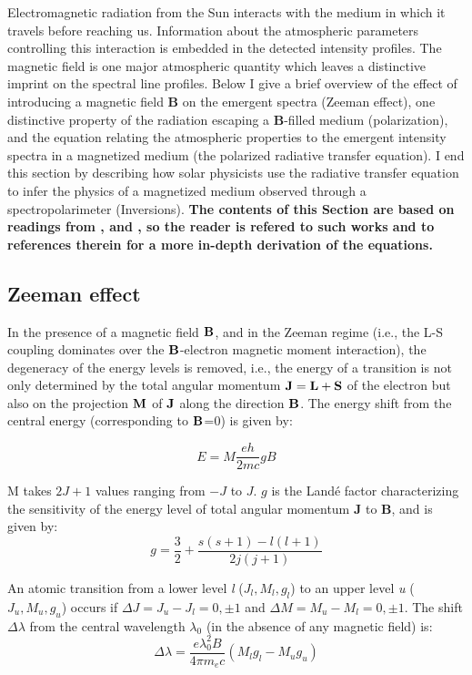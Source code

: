 \documentclass[goettingen, gauss, print]{thesis}
\begin{document}
Electromagnetic radiation from the Sun interacts with the medium in which it travels before reaching us. Information about the atmospheric parameters controlling this interaction is embedded in the detected intensity profiles. The magnetic field is one major atmospheric quantity which leaves a distinctive imprint on the spectral line profiles. Below I give a brief overview of the effect of introducing a magnetic field $\textbf{B}$ on the emergent spectra (Zeeman effect), one distinctive property of the radiation escaping a $\textbf{B}$-filled medium (polarization), and the equation relating the atmospheric properties to the emergent intensity spectra in a magnetized medium (the polarized radiative transfer equation). I end this section by describing how solar physicists use the radiative transfer equation to infer the physics of a magnetized medium observed through a spectropolarimeter (Inversions). \textbf{The contents of this Section are based on readings from \cite{solanki_photospheric_1987}, \cite{del_toro_iniesta_introduction_2003} and \cite{stix_sun_2004}, so the reader is refered to such works and to references therein for a more in-depth derivation of the equations.}  

\subsection{Zeeman effect}
\label{intro-Zeeman}
In the presence of a magnetic field $\bold{B}$, and in the Zeeman regime (i.e., the L-S coupling dominates over the $\bold{B}$-electron magnetic moment interaction), the degeneracy of the energy levels is removed, i.e., the energy of a transition is not only determined by the total angular momentum $\bold{J = L + S}$ of the electron but also on the projection $\bold{M}$ of $\bold{J}$ along the direction $\bold{B}$.
The energy shift from the central energy (corresponding to $\bold{B}$=0) is given by:

\begin{equation}
E = M\frac{e h}{2mc} g B
\end{equation}

M takes $2J+1$ values ranging from $-J$ to $J$. $g$ is the Land\'{e} factor characterizing the sensitivity of the energy level of total angular momentum $\textbf{J}$ to $\textbf{B}$, and is given by:
\begin{equation}
g = \frac{3}{2} +\frac{s(s+1)-l(l+1)}{2j(j+1)}
\label{g}
\end{equation}

An atomic transition from a lower level \textit{l} ($J_l, M_l, g_l$) to an upper level \textit{u} ($J_u, M_u, g_u$) occurs if $\Delta J=J_u-J_l=0,\pm 1$ and $\Delta M = M_u-M_l=0,\pm 1$. The shift $\Delta\lambda$ from the central wavelength $\lambda_0$ (in the absence of any magnetic field) is:
\begin{equation}
\Delta \lambda = \frac{e\lambda_0^2B}{4\pi m_e c}(M_lg_l - M_ug_u)
\label{del_lam}
\end{equation}
\end{document}

